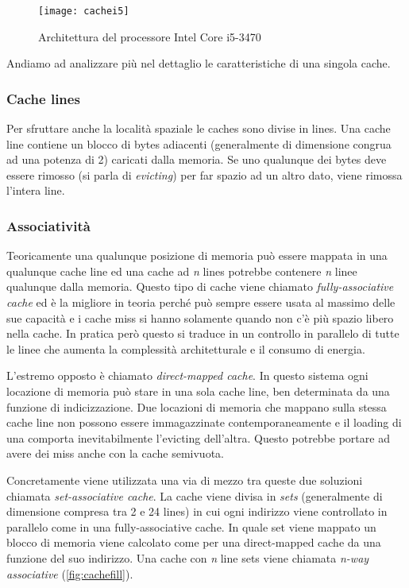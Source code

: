 			\begin{figure}
				\begin{center}
					\texttt{[image: cachei5]}
					\caption{Architettura del processore Intel Core i5-3470}
					\label{fig:cachei5}
				\end{center}
			\end{figure}
			
			Andiamo ad analizzare più nel dettaglio le caratteristiche di una singola cache\cite{ge2016survey,yarom2014flush+}.
			
			\subsubsection{Cache lines}
				Per sfruttare anche la località spaziale le caches sono divise in lines. Una cache line contiene un blocco di bytes adiacenti (generalmente di dimensione congrua ad una potenza di 2) caricati dalla memoria. Se uno qualunque dei bytes deve essere rimosso (si parla di \emph{evicting}) per far spazio ad un altro dato, viene rimossa l'intera line.
				
			\subsubsection{Associatività}
				Teoricamente una qualunque posizione di memoria può essere mappata in una qualunque cache line ed una cache ad \emph{n} lines potrebbe contenere \emph{n} linee qualunque dalla memoria. Questo tipo di cache viene chiamato \emph{fully-associative cache} ed è la migliore in teoria perché può sempre essere usata al massimo delle sue capacità e i cache miss si hanno solamente quando non c'è più spazio libero nella cache. In pratica però questo si traduce in un controllo in parallelo di tutte le linee che aumenta la complessità architetturale e il consumo di energia.
				
				L'estremo opposto è chiamato \emph{direct-mapped cache}. In questo sistema ogni locazione di memoria può stare in una sola cache line, ben determinata da una funzione di indicizzazione. Due locazioni di memoria che mappano sulla stessa cache line non possono essere immagazzinate contemporaneamente e il loading di una comporta inevitabilmente l'evicting dell'altra. Questo potrebbe portare ad avere dei miss anche con la cache semivuota.
				
				Concretamente viene utilizzata una via di mezzo tra queste due soluzioni chiamata \emph{set-associative cache}. La cache viene divisa in \emph{sets} (generalmente di dimensione compresa tra 2 e 24 lines) in cui ogni indirizzo viene controllato in parallelo come in una fully-associative cache. In quale set viene mappato un blocco di memoria viene calcolato come per una direct-mapped cache da una funzione del suo indirizzo. Una cache con \emph{n} line sets viene chiamata \emph{n-way associative} (\cref{fig:cachefill}).
				
